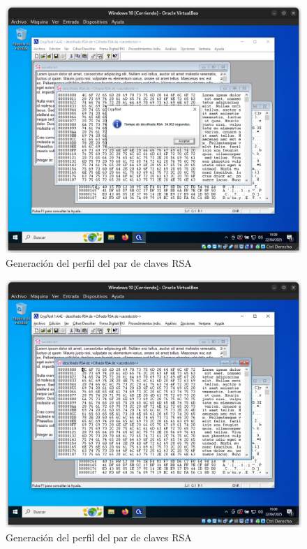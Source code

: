 \begin{figure}[H]
    \includegraphics[width=15cm]{DesencriptadoRSA-1}
    \caption{Generación del perfil del par de claves RSA}
\end{figure}

\begin{figure}[H]
    \includegraphics[width=15cm]{DesencriptadoRSA-2}
    \caption{Generación del perfil del par de claves RSA}
\end{figure}

